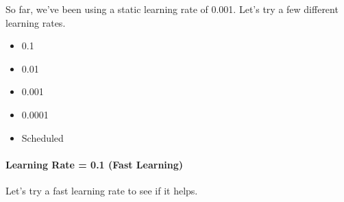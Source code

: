 \documentclass[11pt]{article}
\providecommand{\tightlist}{%
      \setlength{\itemsep}{0pt}\setlength{\parskip}{0pt}}
\begin{document}
So far, we've been using a static learning rate of 0.001. Let's try a
few different learning rates.

\begin{itemize}
\tightlist
\item
  0.1
\item
  0.01
\item
  0.001
\item
  0.0001
\item
  Scheduled
\end{itemize}

\paragraph{Learning Rate = 0.1 (Fast
Learning)}\label{learning-rate-0.1-fast-learning}

Let's try a fast learning rate to see if it helps.
\end{document}
